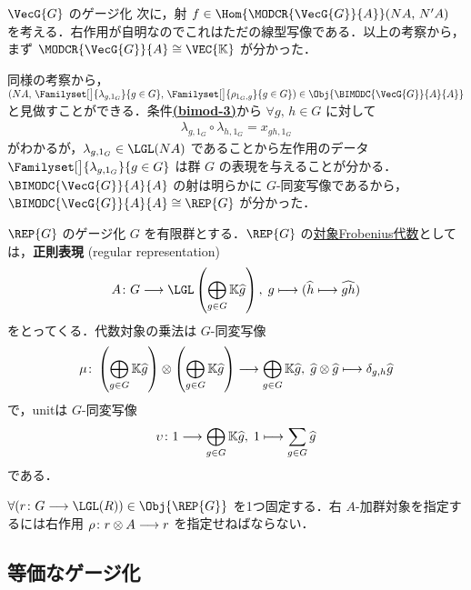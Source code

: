 \documentclass[TQFT_main]{subfiles}
\begin{document}
\begin{myexample}[label=ex:gauging-VecG]{$\VecG{G}$ のゲージ化}
    次に，射 $f \in \Hom{\MODCR{\VecG{G}}{A}}(NA,\, N' A)$ を考える．右作用が自明なのでこれはただの線型写像である．以上の考察から，まず $\MODCR{\VecG{G}}{A} \cong \VEC{\mathbb{K}}$ が分かった．

    同様の考察から，$(NA,\, \Familyset[\big]{\lambda_{g,1_G}}{g \in G},\,  \Familyset[\big]{\rho_{1_G,g}}{g \in G}) \in \Obj{\BIMODC{\VecG{G}}{A}{A}}$ と見做すことができる．条件\hyperref[def:bimodobj]{\textsf{\textbf{(bimod-3)}}}から $\forall g,\, h \in G$ に対して
    \begin{align}
        \lambda_{g,1_G} \circ \lambda_{h,1_G} = x_{gh,1_G}
    \end{align}
    がわかるが，$\lambda_{g,1_G} \in \LGL(NA)$ であることから左作用のデータ $\Familyset[\big]{\lambda_{g,1_G}}{g \in G}$ は群 $G$ の表現を与えることが分かる．$\BIMODC{\VecG{G}}{A}{A}$ の射は明らかに $G$-同変写像であるから，$\BIMODC{\VecG{G}}{A}{A} \cong \REP{G}$ が分かった．
\end{myexample}

\begin{myexample}[label=ex:gaiging-RepG]{$\REP{G}$ のゲージ化}
    $G$ を有限群とする．$\REP{G}$ の\hyperref[def:sym-Frobenius]{対象Frobenius代数}としては，\textbf{正則表現} (regular representation)
    \begin{align}
        A \colon G \lto \LGL \left( \bigoplus_{g \in G} \mathbb{K} \widehat{g} \right),\; g \lmto (\widehat{h} \lmto \widehat{gh})
    \end{align}
    をとってくる．代数対象の乗法は $G$-同変写像
    \begin{align}
        \mu \colon \left( \bigoplus_{g \in G} \mathbb{K} \widehat{g} \right) \otimes \left( \bigoplus_{g \in G} \mathbb{K} \widehat{g} \right) \longrightarrow \bigoplus_{g \in G} \mathbb{K} \widehat{g},\; \widehat{g} \otimes \widehat{g} \longmapsto \delta_{g,h} \widehat{g}
    \end{align}
    で，unitは $G$-同変写像
    \begin{align}
        \upsilon \colon 1 \longrightarrow \bigoplus_{g \in G} \mathbb{K} \widehat{g},\; 1 \longmapsto \sum_{g \in G} \widehat{g}
    \end{align}
    である．

    $\forall (r \colon G \lto \LGL(R)) \in \Obj{\REP{G}}$ を1つ固定する．右 $A$-加群対象を指定するには右作用 $\rho \colon r \otimes A \longrightarrow r$ を指定せねばならない．
    
\end{myexample}


\subsection{等価なゲージ化}
\end{document}
